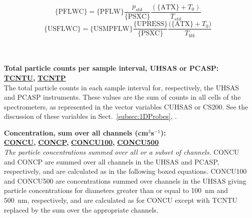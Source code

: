 \begin{hangparagraphs}
{\begin{minipage}[t]{0.9\textwidth}
\begin{equation}
\mathrm{\{PFLWC\}}=\mathrm{\{PFLW\}}\frac{p_{std}}{\mathrm{\{PSXC\}}}\frac{(\mathrm{\{ATX\}}+T_{0})}{T_{std}}\label{eq:12.3}
\end{equation}
\begin{equation}
\mathrm{\{USFLWC\}}=\mathrm{\{USMPFLW\}}\frac{\mathrm{\{UPRESS\}}}{\mathrm{\{PSXC\}}}\frac{\mathrm{(\{ATX\}}+T_{0})}{T_{blk}}\label{eq:12.4}
\end{equation}
%
\end{minipage}} \\
\\

\textbf{Total particle counts per sample interval, UHSAS or PCASP:}\hypertarget{TCNTL}{}\hypertarget{TCHTP}{}\textbf{
}\textbf{\uline{TCNTU}}\textbf{, }\textbf{\uline{TCNTP}}\\
The total particle counts in each sample interval for, respectively,
the UHSAS and PCASP instruments. These values are the sum of counts
in all cells of the spectrometers, as represented in the vector variables
CUHSAS or CS200. See the discussion of these variables in Sect.~\ref{subsec:1DProbes},
.

\textbf{Concentration, sum over all channels (cm$^{3}$s$^{-1}$):}\hypertarget{CONCU}{}\hypertarget{CONCP}{}\hypertarget{CONCU100}{}\hypertarget{CONCU500}{}\textbf{
}\textbf{\uline{}}\\
\textbf{\uline{CONCU}}\textbf{, }\textbf{\uline{CONCP}}\textbf{,
}\textbf{\uline{CONCU100}}\textbf{, }\textbf{\uline{CONCU500}}\\
\emph{The particle concentrations summed over all or a subset of channels.}
CONCU and CONCP are summed over all
channels in the UHSAS and PCASP, respectively,
and are calculated as in the following boxed equations. CONCU100 and
CONCU500 are concentrations summed over channels in the UHSAS giving
particle concentrations for diameters greater than or equal to 100~nm
and 500~nm, respectively, and are calculated as for CONCU except
with TCNTU replaced by the sum over the appropriate channels.\\
\\
\end{hangparagraphs}
